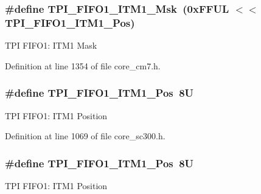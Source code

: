\subsubsection[{\texorpdfstring{T\+P\+I\+\_\+\+F\+I\+F\+O1\+\_\+\+I\+T\+M1\+\_\+\+Msk}{TPI_FIFO1_ITM1_Msk}}]{\setlength{\rightskip}{0pt plus 5cm}\#define T\+P\+I\+\_\+\+F\+I\+F\+O1\+\_\+\+I\+T\+M1\+\_\+\+Msk~(0x\+F\+F\+U\+L $<$$<$ T\+P\+I\+\_\+\+F\+I\+F\+O1\+\_\+\+I\+T\+M1\+\_\+\+Pos)}\hypertarget{group___c_m_s_i_s___t_p_i_ga3347f42828920dfe56e3130ad319a9e6}{}\label{group___c_m_s_i_s___t_p_i_ga3347f42828920dfe56e3130ad319a9e6}
T\+PI F\+I\+F\+O1\+: I\+T\+M1 Mask 

Definition at line 1354 of file core\+\_\+cm7.\+h.

\subsubsection[{\texorpdfstring{T\+P\+I\+\_\+\+F\+I\+F\+O1\+\_\+\+I\+T\+M1\+\_\+\+Pos}{TPI_FIFO1_ITM1_Pos}}]{\setlength{\rightskip}{0pt plus 5cm}\#define T\+P\+I\+\_\+\+F\+I\+F\+O1\+\_\+\+I\+T\+M1\+\_\+\+Pos~8U}\hypertarget{group___c_m_s_i_s___t_p_i_gaece86ab513bc3d0e0a9dbd82258af49f}{}\label{group___c_m_s_i_s___t_p_i_gaece86ab513bc3d0e0a9dbd82258af49f}
T\+PI F\+I\+F\+O1\+: I\+T\+M1 Position 

Definition at line 1069 of file core\+\_\+sc300.\+h.

\subsubsection[{\texorpdfstring{T\+P\+I\+\_\+\+F\+I\+F\+O1\+\_\+\+I\+T\+M1\+\_\+\+Pos}{TPI_FIFO1_ITM1_Pos}}]{\setlength{\rightskip}{0pt plus 5cm}\#define T\+P\+I\+\_\+\+F\+I\+F\+O1\+\_\+\+I\+T\+M1\+\_\+\+Pos~8U}\hypertarget{group___c_m_s_i_s___t_p_i_gaece86ab513bc3d0e0a9dbd82258af49f}{}\label{group___c_m_s_i_s___t_p_i_gaece86ab513bc3d0e0a9dbd82258af49f}
T\+PI F\+I\+F\+O1\+: I\+T\+M1 Position 

